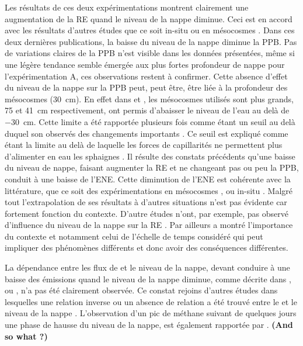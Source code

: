Les résultats de ces deux expérimentations montrent clairement une augmentation de la RE quand le niveau de la nappe diminue.
Ceci est en accord avec les résultats d'autres études que ce soit in-situ \citep{ballantyne2014} ou en mésocosmes \citep{blodau2004,dinsmore2009}.
Dans ces deux dernières publications, la baisse du niveau de la nappe diminue la PPB.
Pas de variations claires de la PPB n'est visible dans les données présentées, même si une légère tendance semble émergée aux plus fortes profondeur de nappe pour l'expérimentation A, ces observations restent à confirmer.
Cette absence d'effet du niveau de la nappe sur la PPB peut, peut être, être liée à la profondeur des mésocosmes (\SI{30}{\centi\metre}).
En effet dans \citet{blodau2004} et \citet{dinsmore2009}, les mésocosmes utilisés sont plus grands, 75 et \SI{41}{\centi\metre} respectivement, ont permis d'abaisser le niveau de l'eau au delà de \SI{-30}{\centi\metre}.
Cette limite a été rapportée plusieurs fois comme étant un seuil au delà duquel son observés des changements importants \citep{blodau2004,peichl2014}.
Ce seuil est expliqué comme étant la limite au delà de laquelle les forces de capillarités ne permettent plus d'alimenter en eau les sphaignes \citep{rydin2013a,ketcheson2014}.
Il résulte des constats précédents qu'une baisse du niveau de nappe, faisant augmenter la RE et ne changeant pas ou peu la PPB, conduit à une baisse de l'ENE.
Cette diminution de l'ENE est cohérente avec la littérature, que ce soit des expérimentations en mésocosmes \citep{aerts1997,blodau2004}, ou in-situ \citep{bubier2003,sonnentag2010}.
Malgré tout l'extrapolation de ses résultats à d'autres situations n'est pas évidente car fortement fonction du contexte.
D'autre études n'ont, par exemple, pas observé d'influence du niveau de la nappe sur la RE \citep{updegraff2001}.
Par ailleurs \citet{laiho2006} a montré l'importance du contexte et notamment celui de l'échelle de temps considéré qui peut impliquer des phénomènes différents et donc avoir des conséquences différentes.

La dépendance entre les flux de \chh et le niveau de la nappe, devant conduire à une baisse des émissions quand le niveau de la nappe diminue, comme décrite dans \citet{aerts1997}, \citet{pelletier2007} ou \citet{turetsky2008}, n'a pas été clairement observée.
Ce constat rejoins d'autres études dans lesquelles une relation inverse ou un absence de relation a été trouvé entre le \chh et le niveau de la nappe \citet{kettunen1996,bellisario1999,treat2007}.
L'observation d'un pic de méthane suivant de quelques jours une phase de hausse du niveau de la nappe, est également rapportée par \citet{kettunen1996}. \textbf{(And so what ?)}


